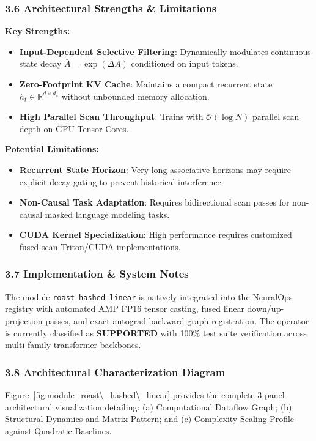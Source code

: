 \subsubsection*{3.6 Architectural Strengths \& Limitations}
\textbf{Key Strengths:}
\begin{itemize}
    \item \textbf{Input-Dependent Selective Filtering}: Dynamically modulates continuous state decay $\bar{A} = \exp(\Delta A)$ conditioned on input tokens.
    \item \textbf{Zero-Footprint KV Cache}: Maintains a compact recurrent state $h_t \in \mathbb{R}^{d \times d_s}$ without unbounded memory allocation.
    \item \textbf{High Parallel Scan Throughput}: Trains with $\mathcal{O}(\log N)$ parallel scan depth on GPU Tensor Cores.
\end{itemize}

\textbf{Potential Limitations:}
\begin{itemize}
    \item \textbf{Recurrent State Horizon}: Very long associative horizons may require explicit decay gating to prevent historical interference.
    \item \textbf{Non-Causal Task Adaptation}: Requires bidirectional scan passes for non-causal masked language modeling tasks.
    \item \textbf{CUDA Kernel Specialization}: High performance requires customized fused scan Triton/CUDA implementations.
\end{itemize}

\subsubsection*{3.7 Implementation \& System Notes}
The module \texttt{roast\_hashed\_linear} is natively integrated into the NeuralOps registry with automated AMP FP16 tensor casting, fused linear down/up-projection passes, and exact autograd backward graph registration. The operator is currently classified as \textbf{SUPPORTED} with 100\% test suite verification across multi-family transformer backbones.

\subsubsection*{3.8 Architectural Characterization Diagram}
Figure~\ref{fig:module_roast\_hashed\_linear} provides the complete 3-panel architectural visualization detailing: (a) Computational Dataflow Graph; (b) Structural Dynamics and Matrix Pattern; and (c) Complexity Scaling Profile against Quadratic Baselines.

